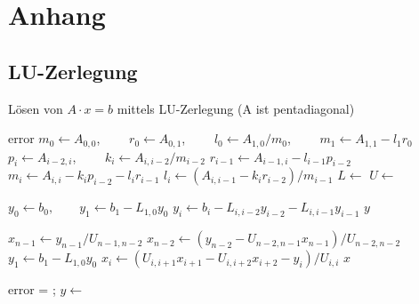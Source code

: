 \chapter{Anhang}


\section{LU-Zerlegung}
\begin{Algorithmus}[H]
\caption{Lösen von $A\cdot x = b$ mittels LU-Zerlegung (A ist pentadiagonal)}
\label{alg:LU}
\begin{algorithmic}
	    \State \Return error
	\EndIf
    \State $m_0 \gets A_{0,0}$, $\qquad r_0 \gets A_{0,1}$, $\qquad l_0 \gets A_{1,0}/m_0$, $ \qquad m_1 \gets A_{1,1}- l_1r_0$
        \State $p_i \gets A_{i-2,i}$, $\qquad k_i \gets A_{i,i-2}/m_{i-2}$
        \State $r_{i-1} \gets A_{i-1,i} - l_{i-1}  p_{i-2}$
        \State $m_i \gets A_{i,i} - k_i p_{i-2} - l_i  r_{i-1}$
        \State $l_i \gets (A_{i,i-1}-k_i r_{i-2})/m_{i-1}$
    \EndFor
    \State $L \gets $         
    \State $U \gets $    
    \State \Return [L, U]
\EndFunction

        \State $y_0 \gets b_0, \qquad y_1 \gets b_1 - L_{1,0} y_0$
            \State $y_i \gets b_i - L_{i,i-2} y_{i-2} - L_{i,i-1} y_{i-1}$
        \EndFor
        \State \Return $y$
\EndFunction


        \State $x_{n-1} \gets y_{n-1}/U_{n-1,n-2}$
        \State $x_{n-2} \gets (y_{n-2} - U_{n-2,n-1} x_{n-1})/U_{n-2,n-2}$
        \State $y_1 \gets b_1 - L_{1,0} y_0$
            \State $x_i \gets (U_{i,i+1} x_{i+1}- U_{i,i+2} x_{i+2} - y_i) / U_{i,i}$
        \EndFor
        \State \Return $x$
\EndFunction




	 \State \Return error	\EndIf
	\State [L,U] = ;
    \State $y \gets $ 
    \State \Return {} 
\EndFunction
\end{algorithmic}
\end{Algorithmus}


